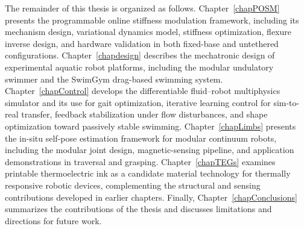 The remainder of this thesis is organized as follows. Chapter~\ref{chapPOSM} presents the programmable online stiffness modulation framework, including its mechanism design, variational dynamics model, stiffness optimization, flexure inverse design, and hardware validation in both fixed-base and untethered configurations. Chapter~\ref{chapdesign} describes the mechatronic design of experimental aquatic robot platforms, including the modular undulatory swimmer and the SwimGym drag-based swimming system. Chapter~\ref{chapControl} develops the differentiable fluid--robot multiphysics simulator and its use for gait optimization, iterative learning control for sim-to-real transfer, feedback stabilization under flow disturbances, and shape optimization toward passively stable swimming. Chapter~\ref{chapLimbs} presents the in-situ self-pose estimation framework for modular continuum robots, including the modular joint design, magnetic-sensing pipeline, and application demonstrations in traversal and grasping. Chapter~\ref{chapTEGs} examines printable thermoelectric ink as a candidate material technology for thermally responsive robotic devices, complementing the structural and sensing contributions developed in earlier chapters. Finally, Chapter~\ref{chapConclusions} summarizes the contributions of the thesis and discusses limitations and directions for future work.
